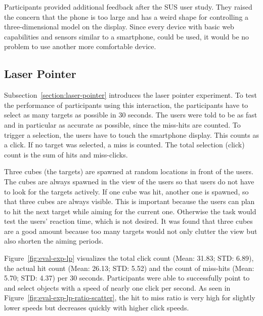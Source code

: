 Participants provided additional feedback after the \gls{SUS} user study. They raised the concern that the phone is too large and has a weird shape for controlling a three-dimensional model on the display. Since every device with basic web capabilities and sensors similar to a smartphone, could be used, it would be no problem to use another more comfortable device. 


\subsection{Laser Pointer}\label{section:eval-res-lp}

Subsection~\ref{section:laser-pointer} introduces the laser pointer experiment. To test the performance of participants using this interaction, the participants have to select as many targets as possible in 30 seconds. The users were told to be as fast and in particular as accurate as possible, since the miss-hits are counted. To trigger a selection, the users have to touch the smartphone display. This counts as a click. If no target was selected, a miss is counted. The total selection (click) count is the sum of hits and miss-clicks.

Three cubes (the targets) are spawned at random locations in front of the users. The cubes are always spawned in the view of the users so that users do not have to look for the targets actively. 
If one cube was hit, another one is spawned, so that three cubes are always visible. This is important because the users can plan to hit the next target while aiming for the current one. Otherwise the task would test the users' reaction time, which is not desired. It was found that three cubes are a good amount because too many targets would not only clutter the view but also shorten the aiming periods.

Figure~\ref{fig:eval-exp-lp} visualizes the total click count (Mean: 31.83; \gls{STD}: 6.89), the actual hit count (Mean: 26.13; \gls{STD}: 5.52) and the count of miss-hits (Mean: 5.70; \gls{STD}: 4.37) per 30 seconds. Participants were able to successfully point to and select objects with a speed of nearly one click per second. As seen in Figure~\ref{fig:eval-exp-lp-ratio-scatter}, the hit to miss ratio is very high for slightly lower speeds but decreases quickly with higher click speeds.

